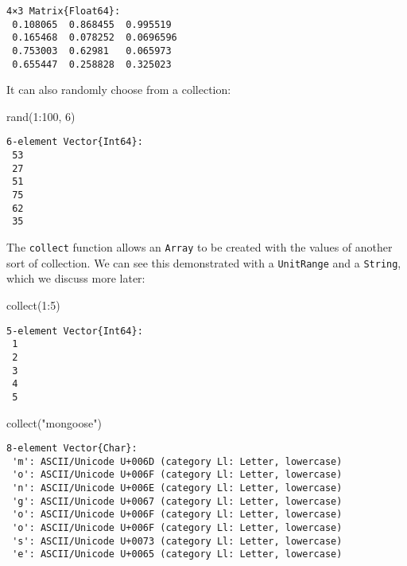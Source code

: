 \documentclass[
  letterpaper,
  DIV=11,
  numbers=noendperiod]{scrreprt}
\newenvironment{Shaded}{\begin{snugshade}}{\end{snugshade}}
\newcommand{\FloatTok}[1]{\textcolor[rgb]{0.68,0.00,0.00}{#1}}
\newcommand{\FunctionTok}[1]{\textcolor[rgb]{0.28,0.35,0.67}{#1}}
\newcommand{\NormalTok}[1]{\textcolor[rgb]{0.00,0.23,0.31}{#1}}
\newcommand{\OperatorTok}[1]{\textcolor[rgb]{0.37,0.37,0.37}{#1}}
\newcommand{\StringTok}[1]{\textcolor[rgb]{0.13,0.47,0.30}{#1}}
\begin{document}
\begin{verbatim}
4×3 Matrix{Float64}:
 0.108065  0.868455  0.995519
 0.165468  0.078252  0.0696596
 0.753003  0.62981   0.065973
 0.655447  0.258828  0.325023
\end{verbatim}

It can also randomly choose from a collection:

\begin{Shaded}
\begin{Highlighting}[]
\FunctionTok{rand}\NormalTok{(}\FloatTok{1}\OperatorTok{:}\FloatTok{100}\NormalTok{, }\FloatTok{6}\NormalTok{)}
\end{Highlighting}
\end{Shaded}

\begin{verbatim}
6-element Vector{Int64}:
 53
 27
 51
 75
 62
 35
\end{verbatim}

The \texttt{collect} function allows an \texttt{Array} to be created
with the values of another sort of collection. We can see this
demonstrated with a \texttt{UnitRange} and a \texttt{String}, which we
discuss more later:

\begin{Shaded}
\begin{Highlighting}[]
\FunctionTok{collect}\NormalTok{(}\FloatTok{1}\OperatorTok{:}\FloatTok{5}\NormalTok{)}
\end{Highlighting}
\end{Shaded}

\begin{verbatim}
5-element Vector{Int64}:
 1
 2
 3
 4
 5
\end{verbatim}

\begin{Shaded}
\begin{Highlighting}[]
\FunctionTok{collect}\NormalTok{(}\StringTok{"mongoose"}\NormalTok{)}
\end{Highlighting}
\end{Shaded}

\begin{verbatim}
8-element Vector{Char}:
 'm': ASCII/Unicode U+006D (category Ll: Letter, lowercase)
 'o': ASCII/Unicode U+006F (category Ll: Letter, lowercase)
 'n': ASCII/Unicode U+006E (category Ll: Letter, lowercase)
 'g': ASCII/Unicode U+0067 (category Ll: Letter, lowercase)
 'o': ASCII/Unicode U+006F (category Ll: Letter, lowercase)
 'o': ASCII/Unicode U+006F (category Ll: Letter, lowercase)
 's': ASCII/Unicode U+0073 (category Ll: Letter, lowercase)
 'e': ASCII/Unicode U+0065 (category Ll: Letter, lowercase)
\end{verbatim}
\end{document}
